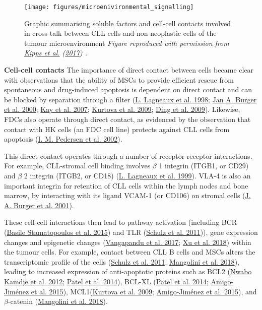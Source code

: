 \documentclass[11pt, a4paper, twosided]{book}
\begin{document}
\begin{figure}

{\centering \texttt{[image: figures/microenivironmental\_signalling]} 

}

\caption{Graphic summarising soluble factors and cell-cell contacts involved in cross-talk between CLL cells and non-neoplastic cells of the tumour microenvironment \emph{Figure reproduced with permission from \protect\hyperlink{ref-Kipps2017}{Kipps et al.} (\protect\hyperlink{ref-Kipps2017}{2017}) .}}\label{fig:microenvironmentSignalling}
\end{figure}
\textbf{Cell-cell contacts}
The importance of direct contact between cells became clear with observations that the ability of MSCs to provide efficient rescue from spontaneous and drug-induced apoptosis is dependent on direct contact and can be blocked by separation through a filter (\protect\hyperlink{ref-Lagneaux1998}{L. Lagneaux et al. 1998}; \protect\hyperlink{ref-Burger2000}{Jan A. Burger et al. 2000}; \protect\hyperlink{ref-Kay2007}{Kay et al. 2007}; \protect\hyperlink{ref-Kurtova2009}{Kurtova et al. 2009}; \protect\hyperlink{ref-Ding2009}{Ding et al. 2009}). Likewise, FDCs also operate through direct contact, as evidenced by the observation that contact with HK cells (an FDC cell line) protects against CLL cells from apoptosis (\protect\hyperlink{ref-Pedersen2002}{I. M. Pedersen et al. 2002}).

This direct contact operates through a number of receptor-receptor interactions. For example, CLL-stromal cell binding involves \(\beta\) 1 integrin (ITGB1, or CD29) and \(\beta\) 2 integrin (ITGB2, or CD18) (\protect\hyperlink{ref-Lagneaux1999}{L. Lagneaux et al. 1999}). VLA-4 is also an important integrin for retention of CLL cells within the lymph nodes and bone marrow, by interacting with its ligand VCAM-1 (or CD106) on stromal cells (\protect\hyperlink{ref-Burger2001}{J. A. Burger et al. 2001}).

These cell-cell interactions then lead to pathway activation (including BCR (\protect\hyperlink{ref-Stamatopoulos2015}{Basile Stamatopoulos et al. 2015}) and TLR (\protect\hyperlink{ref-Schulz2011}{Schulz et al. 2011})), gene expression changes and epigenetic changes (\protect\hyperlink{ref-Vangapandu2017}{Vangapandu et al. 2017}; \protect\hyperlink{ref-Xu2018}{Xu et al. 2018}) within the tumour cells. For example, contact between CLL B cells and MSCs alters the transcriptomic profile of the cells (\protect\hyperlink{ref-Schulz2011}{Schulz et al. 2011}; \protect\hyperlink{ref-Mangolini2018}{Mangolini et al. 2018}), leading to increased expression of anti-apoptotic proteins such as BCL2 (\protect\hyperlink{ref-Nwabo2012}{Nwabo Kamdje et al. 2012}; \protect\hyperlink{ref-Patel2014}{Patel et al. 2014}), BCL-XL (\protect\hyperlink{ref-Patel2014}{Patel et al. 2014}; \protect\hyperlink{ref-AmigoJimenez2015}{Amigo-Jiménez et al. 2015}), MCL1(\protect\hyperlink{ref-Kurtova2009}{Kurtova et al. 2009}; \protect\hyperlink{ref-AmigoJimenez2015}{Amigo-Jiménez et al. 2015}), and \(\beta\)-catenin (\protect\hyperlink{ref-Mangolini2018}{Mangolini et al. 2018}).
\end{document}
